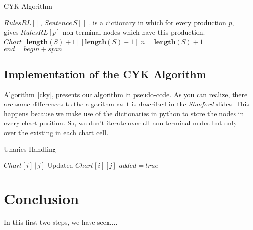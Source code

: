 \documentclass[a4paper,11pt]{article}
\begin{document}
\begin{algorithm}[t!]
\caption{CYK Algorithm}
\label{cky}
\begin{small}
\begin{algorithmic}[1]
$RulesRL[]$, $Sentence\ S[]$
, is a dictionary in which for every production $p$, gives $RulesRL[p]$ non-terminal nodes which have this production.
$Chart[\textbf{length}(S)+1][\textbf{length}(S)+1]$
\ELSE
{}
\ENDFOR
\ENDIF
{}
\ENDFOR
\STATE $n = \textbf{length}(S) + 1$
\STATE $end = begin + span$
\ENDFOR
\ENDFOR
\ENDFOR
\ENDFOR
{}
\ENDFOR
\ENDFOR
\end{algorithmic}
\end{small}
\end{algorithm}

\subsection{Implementation of the CYK Algorithm}
Algorithm~\ref{cky}, presents our algorithm in pseudo-code. As you can realize, there are some differences to the algorithm as it is described in the \textit{Stanford} slides. This happens because we make use of the dictionaries in python to store the nodes in every chart position. So, we don't iterate over all non-terminal nodes but only over the existing in each chart cell.

\begin{algorithm}[t!]
\caption{Unaries Handling}
\label{unaries}
\begin{small}
\begin{algorithmic}[1]
$Chart[i][j]$
Updated $Chart[i][j]$
\STATE $added = true$
\ENDFOR
\ENDFOR
\ENDWHILE
\end{algorithmic}
\end{small}
\end{algorithm}


\section{Conclusion}
\label{concl}
In this first two steps, we have seen....
\end{document}
